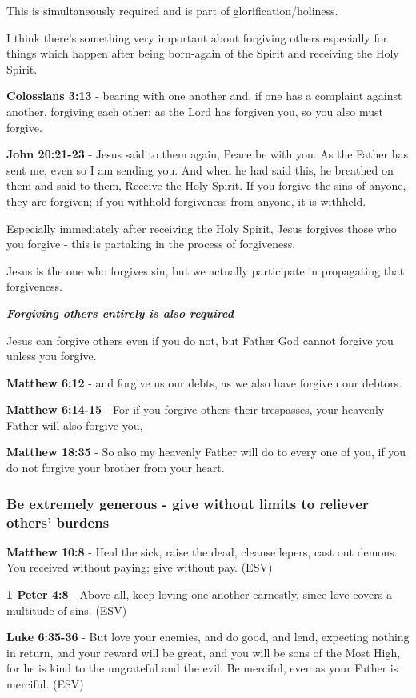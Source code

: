 \documentclass[11pt]{article}
\begin{document}
This is simultaneously required and is part of glorification/holiness.

I think there's something very important about forgiving others especially for things which happen after being born-again of the Spirit and receiving the Holy Spirit.

\textbf{Colossians 3:13} - bearing with one another and, if one has a complaint against another, forgiving each other; as the Lord has forgiven you, so you also must forgive.

\textbf{John 20:21-23} - Jesus said to them again, Peace be with you. As the Father has sent me, even so I am sending you. And when he had said this, he breathed on them and said to them, Receive the Holy Spirit. If you forgive the sins of anyone, they are forgiven; if you withhold forgiveness from anyone, it is withheld.

Especially immediately after receiving the Holy Spirit, Jesus forgives those who you forgive - this is partaking in the process of forgiveness.

Jesus is the one who forgives sin, but we actually participate in propagating that forgiveness.

\emph{\textbf{Forgiving others entirely is also required}}

Jesus can forgive others even if you do not, but Father God cannot forgive you unless you forgive.

\textbf{Matthew 6:12} - and forgive us our debts, as we also have forgiven our debtors.

\textbf{Matthew 6:14-15} - For if you forgive others their trespasses, your heavenly Father will also forgive you,

\textbf{Matthew 18:35} - So also my heavenly Father will do to every one of you, if you do not forgive your brother from your heart.

\subsubsection{Be extremely generous - give without limits to reliever others' burdens}
\label{sec:org53cf6b8}
\textbf{Matthew 10:8} - Heal the sick, raise the dead, cleanse lepers, cast out demons. You received without paying; give without pay. (ESV)

\textbf{1 Peter 4:8} -  Above all, keep loving one another earnestly, since love covers a multitude of sins.  (ESV)

\textbf{Luke 6:35-36} -  But love your enemies, and do good, and lend, expecting nothing in return, and your reward will be great, and you will be sons of the Most High, for he is kind to the ungrateful and the evil.  Be merciful, even as your Father is merciful.  (ESV)
\end{document}
